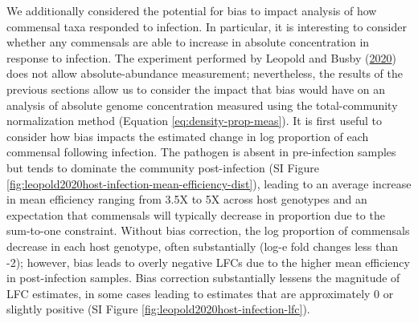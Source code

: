 \documentclass[
]{article}
\begin{document}
We additionally considered the potential for bias to impact analysis of how commensal taxa responded to infection.
In particular, it is interesting to consider whether any commensals are able to increase in absolute concentration in response to infection.
The experiment performed by Leopold and Busby (\protect\hyperlink{ref-leopold2020host}{2020}) does not allow absolute-abundance measurement; nevertheless, the results of the previous sections allow us to consider the impact that bias would have on an analysis of absolute genome concentration
measured using the total-community normalization method (Equation \eqref{eq:density-prop-meas}).
It is first useful to consider how bias impacts the estimated change in log proportion of each commensal following infection.
The pathogen is absent in pre-infection samples but tends to dominate the community post-infection (SI Figure \ref{fig:leopold2020host-infection-mean-efficiency-dist}), leading to an average increase in mean efficiency ranging from 3.5X to 5X across host genotypes and an expectation that commensals will typically decrease in proportion due to the sum-to-one constraint.
Without bias correction, the log proportion of commensals decrease in each host genotype, often substantially (log-e fold changes less than -2); however, bias leads to overly negative LFCs due to the higher mean efficiency in post-infection samples.
Bias correction substantially lessens the magnitude of LFC estimates, in some cases leading to estimates that are approximately 0 or slightly positive (SI Figure \ref{fig:leopold2020host-infection-lfc}).
\end{document}
